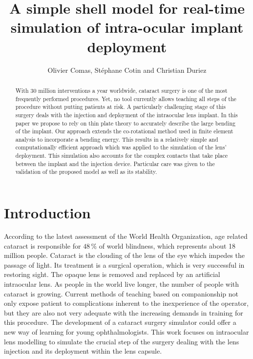 \documentclass{llncs}
\begin{document}
\title{A simple shell model for real-time simulation of intra-ocular implant deployment}
\author{Olivier Comas, St\'ephane Cotin and Christian Duriez}

\maketitle

\begin{abstract}
With 30 million interventions a year worldwide, cataract surgery is one of the most frequently performed procedures. Yet, no tool currently allows teaching all steps of the procedure without putting patients at risk. A particularly challenging stage of this surgery deals with the injection and deployment of the intraocular lens implant. In this paper we propose to rely on thin plate theory to accurately describe the large bending of the implant. Our approach extends the co-rotational method used in finite element analysis to incorporate a bending energy. This results in a relatively simple and computationally efficient approach which was applied to the simulation of the lens' deployment. This simulation also accounts for the complex contacts that take place between the implant and the injection device. Particular care was given to the validation of the proposed model as well as its stability. 
\end{abstract}

\section{Introduction}
According to the latest assessment of the World Health Organization, age related cataract is responsible for $48\,\%$ of world blindness, which represents about 18 million people. Cataract is the clouding of the lens of the eye which impedes the passage of light. Its treatment is a surgical operation, which is very successful in restoring sight. The opaque lens is removed and replaced by an artificial intraocular lens. As people in the world live longer, the number of people with cataract is growing.  Current methods of teaching based on companionship not only expose patient to complications inherent to the inexperience of the operator, but they are also not very adequate with the increasing demands in training for this procedure. The development of a cataract surgery simulator could offer a new way of learning for young ophthalmologists. This work focuses on intraocular lens modelling to simulate the crucial step of the surgery dealing with the lens injection and its deployment within the lens capsule. 
\end{document}
